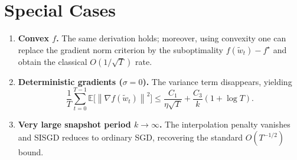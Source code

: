 \documentclass{article}
\newcommand{\E}{\mathbb{E}}
\newcommand{\norm}[1]{\left\lVert #1\right\rVert}
\begin{document}
\section*{Special Cases}
\begin{enumerate}
\item \textbf{Convex $f$.} The same derivation holds; moreover, using convexity one can replace the gradient norm criterion by the suboptimality $f(\tilde w_t)-f^\star$ and obtain the classical $O(1/\sqrt{T})$ rate.
\item \textbf{Deterministic gradients ($\sigma=0$).} The variance term disappears, yielding
\[
\frac{1}{T}\sum_{t=0}^{T-1}\E\!\bigl[\norm{\nabla f(\tilde w_t)}^2\bigr]
\le
\frac{C_1}{\eta\sqrt{T}}+\frac{C_3}{k}(1+\log T).
\]
\item \textbf{Very large snapshot period $k\to\infty$.} The interpolation penalty vanishes and SISGD reduces to ordinary SGD, recovering the standard $O(T^{-1/2})$ bound.
\end{enumerate}
\end{document}
